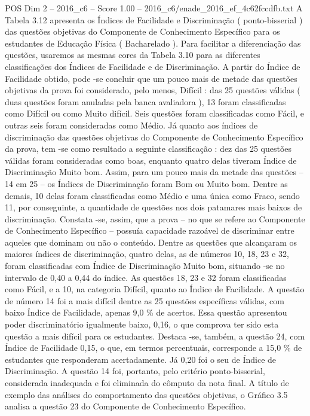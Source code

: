 \begin{textsample}{POS Dim 2 – 2016\_c6 – Score 1.00 – 2016\_c6/enade\_2016\_ef\_4c62fccdfb.txt}
A Tabela 3.12 apresenta os Índices de Facilidade e Discriminação ( ponto-bisserial ) das questões objetivas do Componente de Conhecimento Específico para os estudantes de Educação Física ( Bacharelado ).
Para facilitar a diferenciação das questões, usaremos as mesmas cores da Tabela 3.10 para as diferentes classificações dos Índices de Facilidade e de Discriminação.
A partir do Índice de Facilidade obtido, pode -se concluir que um pouco mais de metade das questões objetivas da prova foi considerado, pelo menos, Difícil : das 25 questões válidas ( duas questões foram anuladas pela banca avaliadora ), 13 foram classificadas como Difícil ou como Muito difícil.
Seis questões foram classificadas como Fácil, e outras seis foram consideradas como Médio.
Já quanto aos índices de discriminação das questões objetivas do Componente de Conhecimento Específico da prova, tem -se como resultado a seguinte classificação : dez das 25 questões válidas foram consideradas como boas, enquanto quatro delas tiveram Índice de Discriminação Muito bom.
Assim, para um pouco mais da metade das questões – 14 em 25 – os Índices de Discriminação foram Bom ou Muito bom.
Dentre as demais, 10 delas foram classificadas como Médio e uma única como Fraco, sendo 11, por conseguinte, a quantidade de questões nos dois patamares mais baixos de discriminação.
Constata -se, assim, que a prova – no que se refere ao Componente de Conhecimento Específico – possuía capacidade razoável de discriminar entre aqueles que dominam ou não o conteúdo.
Dentre as questões que alcançaram os maiores índices de discriminação, quatro delas, as de números 10, 18, 23 e 32, foram classificadas com Índice de Discriminação Muito bom, situando -se no intervalo de 0,40 a 0,44 do índice.
As questões 18, 23 e 32 foram classificadas como Fácil, e a 10, na categoria Difícil, quanto ao Índice de Facilidade.
A questão de número 14 foi a mais difícil dentre as 25 questões específicas válidas, com baixo Índice de Facilidade, apenas 9,0 \% de acertos.
Essa questão apresentou poder discriminatório igualmente baixo, 0,16, o que comprova ter sido esta questão a mais difícil para os estudantes.
Destaca -se, também, a questão 24, com Índice de Facilidade 0,15, o que, em termos percentuais, corresponde a 15,0 \% de estudantes que responderam acertadamente.
Já 0,20 foi o seu de Índice de Discriminação.
A questão 14 foi, portanto, pelo critério ponto-bisserial, considerada inadequada e foi eliminada do cômputo da nota final.
A título de exemplo das análises do comportamento das questões objetivas, o Gráfico 3.5 analisa a questão 23 do Componente de Conhecimento Específico.

\end{textsample}
